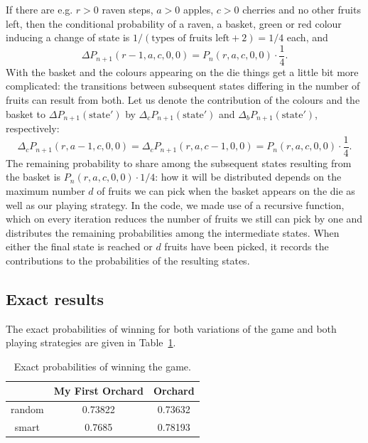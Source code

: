 \documentclass{article}
\begin{document}
If there are e.g. \(r > 0\) raven steps, \(a > 0\) apples, \(c > 0\) cherries and no other fruits left, then the conditional probability of a raven, a basket, green or red colour inducing a change of state is \(1/(\text{types of fruits left} + 2) = 1/4\) each, and
\[
  \Delta P_{n+1}(r-1, a, c, 0, 0) = P_n(r, a, c, 0, 0) \cdot \frac{1}{4}.
\]
With the basket and the colours appearing on the die things get a little bit more complicated: the transitions between subsequent states differing in the number of fruits can result from both. Let us denote the contribution of the colours and the basket to \(\Delta P_{n+1}(\text{state}')\) by \(\Delta_c P_{n+1}(\text{state}')\) and \(\Delta_b P_{n+1}(\text{state}')\), respectively:
\[
  \Delta_c P_{n+1}(r, a-1, c, 0, 0) = \Delta_c P_{n+1}(r, a, c-1, 0, 0) = P_n(r, a, c, 0, 0) \cdot \frac{1}{4}.
\]
The remaining probability to share among the subsequent states resulting from the basket is \(P_n(r, a, c, 0, 0) \cdot 1/4\): how it will be distributed depends on the maximum number \(d\) of fruits we can pick when the basket appears on the die as well as our playing strategy. In the code, we made use of a recursive function, which on every iteration reduces the number of fruits we still can pick by one and distributes the remaining probabilities among the intermediate states. When either the final state is reached or \(d\) fruits have been picked, it records the contributions to the probabilities of the resulting states.

\subsection{Exact results}
The exact probabilities of winning for both variations of the game and both playing strategies are given in Table~\ref{exact}.
\begin{table}[h]
\centering
  \begin{tabular}{c|cc}
  & My First Orchard & Orchard \\
  \hline
  random & 0.73822 & 0.73632 \\
  smart & 0.7685 & 0.78193
  \end{tabular}
\caption{Exact probabilities of winning the game.}
\label{exact}
\end{table}
\end{document}
